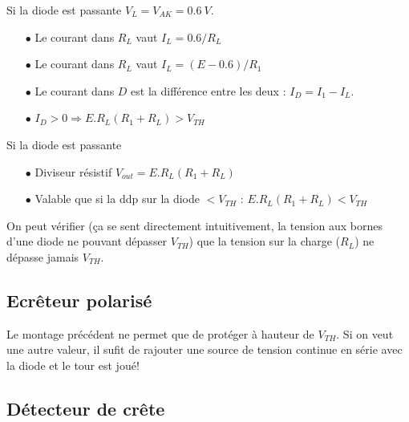 		Si la diode est passante $V_L=V_{AK}=0.6\ V$.
		\begin{itemize}
		\item[$\bullet$] Le courant dans $R_L$ vaut $I_L = 0.6/R_L$
		\item[$\bullet$] Le courant dans $R_L$ vaut $I_L = (E-0.6)/R_1$		
		\item[$\bullet$] Le courant dans $D$ est la différence entre les deux : $I_D 
		= I_1-I_L$.
		\item[$\bullet$] $I_D > 0 \Rightarrow E.R_L(R_1+R_L)>V_{TH}$
		\end{itemize}
		Si la diode est passante 
		\begin{itemize}
		\item[$\bullet$] Diviseur résistif  $V_{out} = E.R_L(R_1+R_L)$
		\item[$\bullet$] Valable que si la ddp sur la diode $<V_{TH}$ : 
		$E.R_L(R_1+R_L)<V_{TH}$
		\end{itemize}				
		On peut vérifier (ça se sent directement intuitivement, la tension aux bornes 
		d'une diode ne pouvant dépasser $V_{TH}$) que la tension sur 
		la charge ($R_L$) ne dépasse jamais $V_{TH}$.
		
		
		\subsection{Ecrêteur polarisé}
		Le montage précédent ne permet que de protéger à hauteur de $V_{TH}$. Si 
		on veut une autre valeur, il sufit de rajouter une source de tension continue 
		en série avec la diode et le tour est joué!
			
		
		\subsection{Détecteur de crête}
			
			
			
			
			
			
			
			
			
			
			
			
			
			
			
			
			
			
			
			